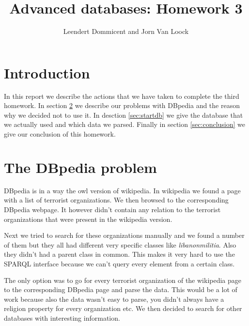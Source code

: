 \documentclass{article}
\title{Advanced databases: Homework 3}
\author{Leendert Dommicent and Jorn Van Loock}
\begin{document}
\maketitle
\section{Introduction}
In this report we describe the actions that we have taken to complete the third homework. In section \ref{sec:dbpedia} we describe our problems with DBpedia and the reason why we decided not to use it. In desction \ref{sec:startdb} we give the database that we actually used and which data we parsed. Finally in section \ref{sec:conclusion} we give our conclusion of this homework.
\section{The DBpedia problem}
\label{sec:dbpedia}
DBpedia\cite{dbpedia} is in a way the owl version of wikipedia. In wikipedia we found a page with a list of terrorist organizations. We then browsed to the corresponding DBpedia webpage. It however didn't contain any relation to the terrorist organizations that were present in the wikipedia version.\par
Next we tried to search for these organizations manually and we found a number of them but they all had different very specific classes like \textit{libanonmilitia}. Also they didn't had a parent class in common. This makes it very hard to use the SPARQL interface because we can't query every element from a certain class.\par
The only option was to go for every terrorist organization of the wikipedia page to the corresponding DBpedia page and parse the data. This would be a lot of work because also the data wasn't easy to parse, you didn't always have a religion property for every organization etc. We then decided to search for other databases with interesting information.
\end{document}
